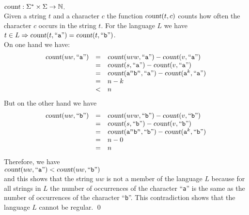 \\[0.2cm]
\hspace*{1.3cm}
$\textsl{count}: \Sigma^* \times \Sigma \rightarrow \mathbb{N}$.
\\[0.2cm]
Given a  string $t$ and a character $c$ the function $\textsl{count}(t,c)$ counts how often the
character $c$ occurs in the string $t$.  For the language  $L$ we have
\\[0.2cm]
\hspace*{1.3cm}
$t \in L \Rightarrow \textsl{count}(t,\mbox{``\texttt{a}''}) = \textsl{count}(t, \mbox{``\texttt{b}''})$. 
\\[0.2cm]
On one hand we have:
\[  
\begin{array}{lcl}
\textsl{count}(uw,\mbox{``\texttt{a}''}) & = & \textsl{count}(uvw,\mbox{``\texttt{a}''}) - \textsl{count}(v,\mbox{``\texttt{a}''}) \\
 & = & \textsl{count}(s,\mbox{``\texttt{a}''}) - \textsl{count}(v,\mbox{``\texttt{a}''}) \\
 & = & \textsl{count}(\mathtt{a}^n\mathtt{b}^n,\mbox{``\texttt{a}''}) - \textsl{count}(\mathtt{a}^k,\mbox{``\texttt{a}''}) \\
 & = & n - k  \\
 & < & n   \\
\end{array}
\]
But on the other hand we have
\[  
\begin{array}{lcl}
\textsl{count}(uw,\mbox{``\texttt{b}''}) & = & \textsl{count}(uvw,\mbox{``\texttt{b}''}) - \textsl{count}(v,\mbox{``\texttt{b}''}) \\
                               & = & \textsl{count}(s,\mbox{``\texttt{b}''}) - \textsl{count}(v,\mbox{``\texttt{b}''}) \\
 & = & \textsl{count}(\mathtt{a}^n\mathtt{b}^n,\mbox{``\texttt{b}''}) - \textsl{count}(\mathtt{a}^k,\mbox{``\texttt{b}''}) \\
                               & = & n  - 0\\
                               & = & n  
\end{array}
\]
Therefore, we have
\\[0.2cm]
\hspace*{1.3cm}
$\textsl{count}(uw,\mbox{``\texttt{a}''}) < \textsl{count}(uw,\mbox{``\texttt{b}''})$
\\[0.2cm]
and this shows that the string $uw$ is not a member of the language $L$ because for all strings in $L$ 
the number of occurrences of the character ``\texttt{a}'' is the same as the number of
occurrences of the character ``\texttt{b}''.  This contradiction shows that the language $L$ cannot
be regular.
\qed

